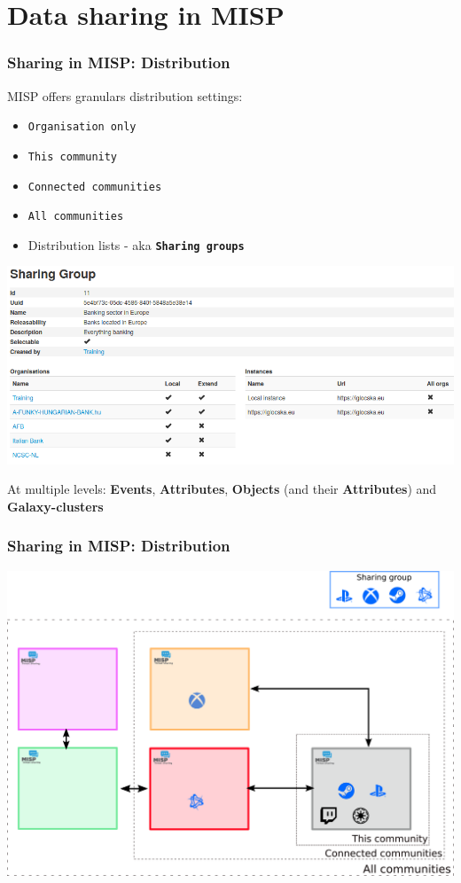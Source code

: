 \section{Data sharing in MISP}
\begin{frame}
    \frametitle{Sharing in MISP: Distribution}
    MISP offers granulars distribution settings:
    \begin{itemize}
        \item \texttt{Organisation only}
        \item \texttt{This community}
        \item \texttt{Connected communities}
        \item \texttt{All communities}
        \item Distribution lists - aka \texttt{\bf Sharing groups}
    \end{itemize}
    \begin{center}
    \includegraphics[scale=0.2]{screenshots/sg-example.png}
    \end{center}

    At multiple levels: {\bf Events}, {\bf Attributes}, {\bf Objects} (and their {\bf Attributes}) and {\bf Galaxy-clusters}
\end{frame}

\begin{frame}
\frametitle{Sharing in MISP: Distribution}
    \begin{center}
        \includegraphics[width=1.0\linewidth]{screenshots/misp-distribution.png}
    \end{center}
\end{frame}

